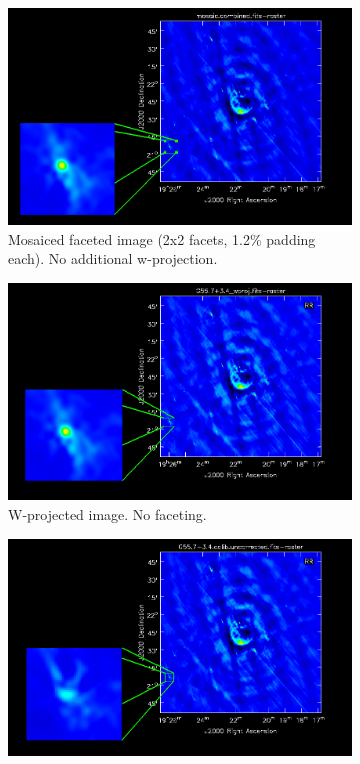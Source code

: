 \begin{figure}[h!]
  \centering
 \begin{subfigure}[b]{0.65\textwidth}
    \centering
    \includegraphics[width=\textwidth]{images/validation/mosaic.png}
    \caption{Mosaiced faceted image (2x2 facets, 1.2\% padding each). No additional w-projection.}
 \end{subfigure}
 \begin{subfigure}[b]{0.65\textwidth}
    \centering
    \includegraphics[width=\textwidth]{images/validation/wproj.png}
    \caption{W-projected image. No faceting.}
 \end{subfigure}
 \begin{subfigure}[b]{0.65\textwidth}
    \centering
    \includegraphics[width=\textwidth]{images/validation/uncorrected.png}

\end{subfigure}
\end{figure}

